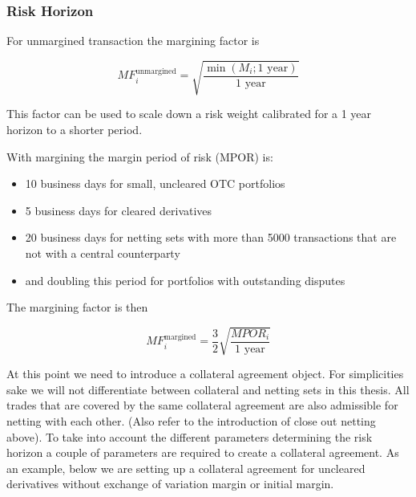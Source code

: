     

    
    \hypertarget{risk-horizon}{%
\subsubsection{Risk Horizon}\label{risk-horizon}}

For unmargined transaction the margining factor is

\[MF^{\text{unmargined}}_i = \sqrt{\frac{\min\left(M_i;1\text{ year}\right)}{1\text{ year}}}\]

This factor can be used to scale down a risk weight calibrated for a 1
year horizon to a shorter period.

With margining the margin period of risk (MPOR) is:

\begin{itemize}
\tightlist
\item
  10 business days for small, uncleared OTC portfolios
\item
  5 business days for cleared derivatives
\item
  20 business days for netting sets with more than 5000 transactions
  that are not with a central counterparty
\item
  and doubling this period for portfolios with outstanding disputes
\end{itemize}

The margining factor is then

\[ MF^{\text{margined}}_i = \frac{3}{2}\sqrt{\frac{MPOR_i}{1\text{ year}}} \]

At this point we need to introduce a collateral agreement object. For
simplicities sake we will not differentiate between collateral and
netting sets in this thesis. All trades that are covered by the same
collateral agreement are also admissible for netting with each other.
(Also refer to the introduction of close out netting above). To take
into account the different parameters determining the risk horizon a
couple of parameters are required to create a collateral agreement. As
an example, below we are setting up a collateral agreement for uncleared
derivatives without exchange of variation margin or initial margin.


